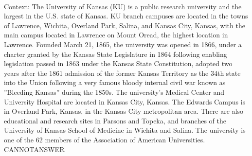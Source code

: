 \documentclass[11pt,a4paper, onecolumn]{article}
\begin{document}
\\ Context: The University of Kansas (KU) is a public research university and the largest in the U.S. state of Kansas. KU branch campuses are located in the towns of Lawrence, Wichita, Overland Park, Salina, and Kansas City, Kansas, with the main campus located in Lawrence on Mount Oread, the highest location in Lawrence. Founded March 21, 1865, the university was opened in 1866, under a charter granted by the Kansas State Legislature in 1864 following enabling legislation passed in 1863 under the Kansas State Constitution, adopted two years after the 1861 admission of the former Kansas Territory as the 34th state into the Union following a very famous bloody internal civil war known as ''Bleeding Kansas'' during the 1850s. The university's Medical Center and University Hospital are located in Kansas City, Kansas. The Edwards Campus is in Overland Park, Kansas, in the Kansas City metropolitan area. There are also educational and research sites in Parsons and Topeka, and branches of the University of Kansas School of Medicine in Wichita and Salina. The university is one of the 62 members of the Association of American Universities. CANNOTANSWER
\end{document}
